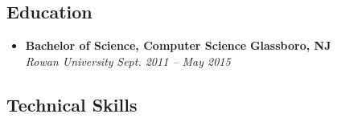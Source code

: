 \begin{itemize}
\begin{comment} %
  \item
  \headerrow
    {\textbf{Rowan University}}
    {\textbf{Glassboro, NJ}}
  \\
  \headerrow
    {\emph{Web Developer, History Department}}
    {\emph{Nov. 2013 -- May 2015}}
  \begin{itemize*}
    \item[$\circ$] Updated and maintained the History Department's website
  \end{itemize*}
  \headerrow
    {\emph{Network Assistant, Network \& System Services}}
    {\emph{July 2014 -- Sept. 2014}}
  \begin{itemize*}
    \item[$\circ$] Installed and maintained network infrastructure across the Glassboro campus
  \end{itemize*}
\end{comment}

\end{itemize}

\subsection*{Education}

\begin{itemize}
  \parskip=0.1em

  \item
  \headerrow
    {\textbf{Bachelor of Science, Computer Science}}
    {\textbf{Glassboro, NJ}}
  \\
  \headerrow
    {\emph{Rowan University}}
    {\emph{Sept. 2011 -- May 2015}}

\end{itemize}

\subsection*{Technical Skills}

